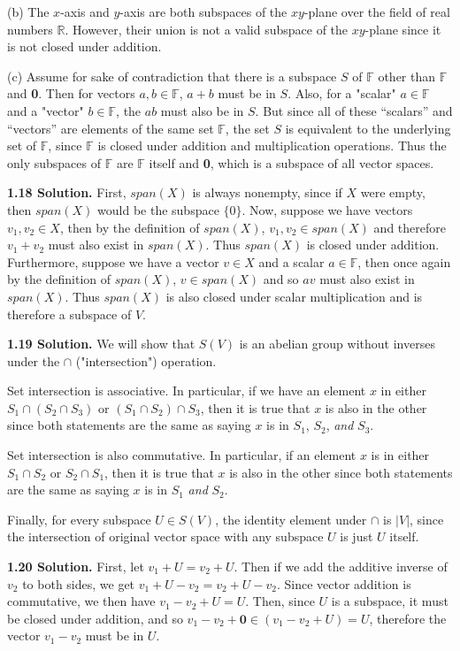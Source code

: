 (b) The $x$-axis and $y$-axis are both subspaces of the $xy$-plane over the field of real numbers $\mathbb{R}$. However, their union is not a valid subspace of the $xy$-plane since it is not closed under addition.

(c) Assume for sake of contradiction that there is a subspace $S$ of $\mathbb{F}$ other than $\mathbb{F}$ and \textbf{0}. Then for vectors $a,b\in\mathbb{F}$, $a+b$ must be in $S$. Also, for a "scalar" $a\in\mathbb{F}$ and a "vector" $b\in\mathbb{F}$, the $ab$ must also be in $S$. But since all of these ``scalars'' and ``vectors'' are elements of the same set $\mathbb{F}$, the set $S$ is equivalent to the underlying set of $\mathbb{F}$, since $\mathbb{F}$ is closed under addition and multiplication operations. Thus the only subspaces of $\mathbb{F}$ are $\mathbb{F}$ itself and \textbf{0}, which is a subspace of all vector spaces.

\textbf{1.18 Solution.} First, $span(X)$ is always nonempty, since if $X$ were empty, then $span(X)$ would be the subspace $\{0\}$. Now, suppose we have vectors $v_1, v_2\in X$, then by the definition of $span(X)$, $v_1,v_2\in span(X)$ and therefore $v_1+v_2$ must also exist in $span(X)$. Thus $span(X)$ is closed under addition. Furthermore, suppose we have a vector $v\in X$ and a scalar $a\in\mathbb{F}$, then once again by the definition of $span(X)$, $v\in span(X)$ and so $av$ must also exist in $span(X)$. Thus $span(X)$ is also closed under scalar multiplication and is therefore a subspace of $V$.

\textbf{1.19 Solution.} We will show that $S(V)$ is an abelian group without inverses under the $\cap$ ("intersection") operation. 

Set intersection is associative. In particular, if we have an element $x$ in either $S_1\cap(S_2\cap S_3)$ or $(S_1\cap S_2)\cap S_3$, then it is true that $x$ is also in the other since both statements are the same as saying $x$ is in $S_1$, $S_2$, \textit{and} $S_3$.

Set intersection is also commutative. In particular, if an element $x$ is in either $S_1\cap S_2$ or $S_2\cap S_1$, then it is true that $x$ is also in the other since both statements are the same as saying $x$ is in $S_1$ \textit{and} $S_2$.

Finally, for every subspace $U\in S(V)$, the identity element under $\cap$ is $|V|$, since the intersection of original vector space with any subspace $U$ is just $U$ itself.

\textbf{1.20 Solution.} First, let $v_1+U=v_2+U$. Then if we add the additive inverse of $v_2$ to both sides, we get $v_1+U-v_2=v_2+U-v_2$. Since vector addition is commutative, we then have $v_1-v_2+U=U$. Then, since $U$ is a subspace, it must be closed under addition, and so  $v_1-v_2+\textbf{0}\in (v_1-v_2+U)=U$, therefore the vector $v_1-v_2$ must be in $U$.

